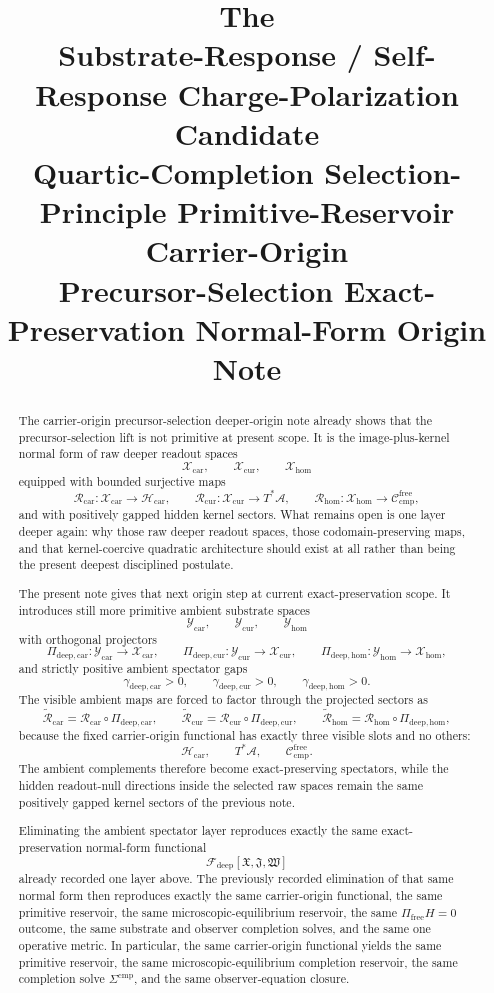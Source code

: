 \documentclass[11pt]{article}
\title{\textbf{The \TheoryName{}}\\[0.4em]
\large Substrate-Response / Self-Response Charge-Polarization Candidate\\
\large Quartic-Completion Selection-Principle Primitive-Reservoir Carrier-Origin\\
\large Precursor-Selection Exact-Preservation Normal-Form Origin Note}
\author{}
\date{}
\newcommand{\Sub}{\mathcal A}
\newcommand{\CompFree}{\mathscr C_{\mathrm{cmp}}^{\mathrm{free}}}
\newcommand{\DeepFunctional}{\mathscr F_{\mathrm{deep}}}
\newcommand{\CarrierClass}{\mathscr H_{\mathrm{car}}}
\newcommand{\DeepTensorClass}{\mathscr X_{\mathrm{car}}}
\newcommand{\DeepRelabelClass}{\mathscr X_{\mathrm{cur}}}
\newcommand{\DeepFreeClass}{\mathscr X_{\mathrm{hom}}}
\newcommand{\DeepTensor}{\mathfrak X}
\newcommand{\DeepRelabel}{\mathfrak J}
\newcommand{\DeepFree}{\mathfrak W}
\newcommand{\CarRead}{\mathcal R_{\mathrm{car}}}
\newcommand{\CurRead}{\mathcal R_{\mathrm{cur}}}
\newcommand{\HomRead}{\mathcal R_{\mathrm{hom}}}
\newcommand{\ProtoTensorClass}{\mathscr Y_{\mathrm{car}}}
\newcommand{\ProtoRelabelClass}{\mathscr Y_{\mathrm{cur}}}
\newcommand{\ProtoFreeClass}{\mathscr Y_{\mathrm{hom}}}
\newcommand{\ProtoCarProj}{\Pi_{\mathrm{deep,car}}}
\newcommand{\ProtoCurProj}{\Pi_{\mathrm{deep,cur}}}
\newcommand{\ProtoHomProj}{\Pi_{\mathrm{deep,hom}}}
\newcommand{\ProtoCarRead}{\widetilde{\mathcal R}_{\mathrm{car}}}
\newcommand{\ProtoCurRead}{\widetilde{\mathcal R}_{\mathrm{cur}}}
\newcommand{\ProtoHomRead}{\widetilde{\mathcal R}_{\mathrm{hom}}}
\newcommand{\ProtoCarGap}{\gamma_{\mathrm{deep,car}}}
\newcommand{\ProtoCurGap}{\gamma_{\mathrm{deep,cur}}}
\newcommand{\ProtoHomGap}{\gamma_{\mathrm{deep,hom}}}
\begin{document}
\maketitle

\begin{abstract}
The carrier-origin precursor-selection deeper-origin note already shows that the precursor-selection lift is not primitive at present scope. It is the image-plus-kernel normal form of raw deeper readout spaces
\[
\DeepTensorClass,\qquad
\DeepRelabelClass,\qquad
\DeepFreeClass
\]
equipped with bounded surjective maps
\[
\CarRead:\DeepTensorClass\to\CarrierClass,
\qquad
\CurRead:\DeepRelabelClass\to T^*\Sub,
\qquad
\HomRead:\DeepFreeClass\to\CompFree,
\]
and with positively gapped hidden kernel sectors. What remains open is one layer deeper again: why those raw deeper readout spaces, those codomain-preserving maps, and that kernel-coercive quadratic architecture should exist at all rather than being the present deepest disciplined postulate.

The present note gives that next origin step at current exact-preservation scope. It introduces still more primitive ambient substrate spaces
\[
\ProtoTensorClass,\qquad
\ProtoRelabelClass,\qquad
\ProtoFreeClass
\]
with orthogonal projectors
\[
\ProtoCarProj:\ProtoTensorClass\to\DeepTensorClass,
\qquad
\ProtoCurProj:\ProtoRelabelClass\to\DeepRelabelClass,
\qquad
\ProtoHomProj:\ProtoFreeClass\to\DeepFreeClass,
\]
and strictly positive ambient spectator gaps
\[
\ProtoCarGap>0,\qquad
\ProtoCurGap>0,\qquad
\ProtoHomGap>0.
\]
The visible ambient maps are forced to factor through the projected sectors as
\[
\ProtoCarRead=\CarRead\circ\ProtoCarProj,
\qquad
\ProtoCurRead=\CurRead\circ\ProtoCurProj,
\qquad
\ProtoHomRead=\HomRead\circ\ProtoHomProj,
\]
because the fixed carrier-origin functional has exactly three visible slots and no others:
\[
\CarrierClass,\qquad
T^*\Sub,\qquad
\CompFree.
\]
The ambient complements therefore become exact-preserving spectators, while the hidden readout-null directions inside the selected raw spaces remain the same positively gapped kernel sectors of the previous note.

Eliminating the ambient spectator layer reproduces exactly the same exact-preservation normal-form functional
\[
\DeepFunctional[\DeepTensor,\DeepRelabel,\DeepFree]
\]
already recorded one layer above. The previously recorded elimination of that same normal form then reproduces exactly the same carrier-origin functional, the same primitive reservoir, the same microscopic-equilibrium reservoir, the same \(\Pi_{\mathrm{free}}H=0\) outcome, the same substrate and observer completion solves, and the same one operative metric. In particular, the same carrier-origin functional yields the same primitive reservoir, the same microscopic-equilibrium completion reservoir, the same completion solve \(\Sigma^{\mathrm{cmp}}\), and the same observer-equation closure.


\end{abstract}
\end{document}

